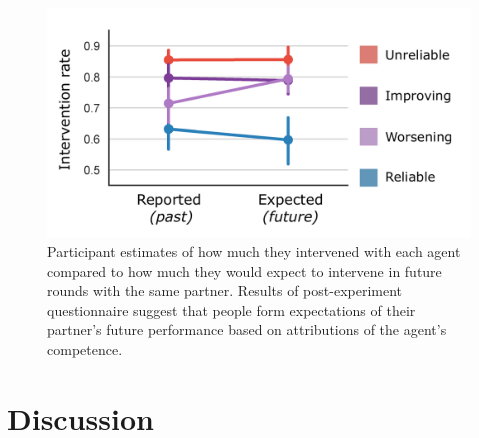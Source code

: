 \documentclass[10pt,letterpaper]{article}
\begin{document}
\begin{figure}[h]
\begin{center}
\includegraphics[width=0.9\linewidth]{img/survey_intervention_expectations_clean.pdf}
\end{center}
\caption{Participant estimates of how much they intervened with each agent compared to how much they would expect to intervene in future rounds with the same partner. Results of post-experiment questionnaire suggest that people form expectations of their partner's future performance based on attributions of the agent's competence.} 
\label{fig:survey}
\end{figure}



\section{Discussion}
\end{document}
